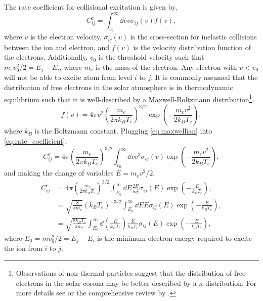 The rate coefficient for collisional excitation is given by,
\begin{equation}\label{eq:rate_coefficient}
    C^e_{ij} = \int_{v_0}^{\infty}\dd{v}v\sigma_{ij}(v)f(v),
\end{equation}
where $v$ is the electron velocity, $\sigma_{ij}(v)$ is the cross-section for inelastic collisions between the ion and electron, and $f(v)$ is the velocity distribution function of the electrons. Additionally, $v_0$ is the threshold velocity such that $m_ev_0^2/2 = E_j - E_i$, where $m_e$ is the mass of the electron. Any electron with $v<v_0$ will not be able to excite atom from level $i$ to $j$. It is commonly assumed that the distribution of free electrons in the solar atmosphere is in thermodynamic equilibrium such that it is well-described by a Maxwell-Boltzmann distribution\footnote{Observations of non-thermal particles \citep[e.g][]{dzifcakova_diagnostics_2011} suggest that the distribution of free electrons in the solar corona may be better described by a $\kappa$-distribution. For more details see \citet{cranmer_suprathermal_2014} or the comprehensive review by \citet{dudik_nonequilibrium_2017}.},
\begin{equation}\label{eq:maxwellian}
    f(v) = 4\pi v^2 \left(\frac{m_e}{2\pi k_BT_e}\right)^{3/2}\exp{\left(-\frac{m_ev^2}{2k_BT_e}\right)},
\end{equation}
where $k_B$ is the Boltzmann constant. Plugging \autoref{eq:maxwellian} into \autoref{eq:rate_coefficient},
\begin{equation*}
    C^e_{ij} =  4\pi\left(\frac{m_e}{2\pi k_BT_e}\right)^{3/2}\int_{v_0}^{\infty}\dd{v}v^3\sigma_{ij}(v)\exp{\left(-\frac{m_ev^2}{2k_BT_e}\right)},
\end{equation*}
and making the change of variables $E=m_ev^2/2$,
\begin{align}\label{eq:rate_coefficient_e}
    C^e_{ij} &= 4\pi\left(\frac{m_e}{2\pi k_BT_e}\right)^{3/2}\int_{E_0}^{\infty}\dd{E}\frac{2E}{m_e^2}\sigma_{ij}(E)\exp{\left(-\frac{E}{k_BT_e}\right)},\nonumber\\
    &= \sqrt{\frac{8}{\pi m_e}}(k_BT_e)^{-3/2}\int_{E_0}^{\infty}\dd{E}E\sigma_{ij}(E)\exp{\left(-\frac{E}{k_BT_e}\right)},\nonumber\\
    &= \sqrt{\frac{8k_BT_e}{\pi m_e}}\int_{E_0}^{\infty}\dd{\left(\frac{E}{k_BT_e}\right)}\frac{E}{k_BT_e}\sigma_{ij}(E)\exp{\left(-\frac{E}{k_BT_e}\right)},
\end{align}
where $E_0=mv_0^2/2=E_j-E_i$ is the minimum electron energy required to excite the ion from $i$ to $j$.

